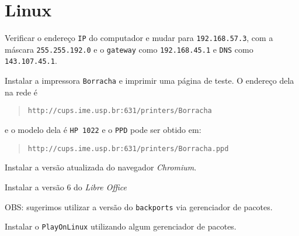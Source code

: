 \section*{Linux}
\begin{questions}

\question
Verificar o endereço \verb+IP+ do computador e mudar para \verb+192.168.57.3+,
com a máscara \verb+255.255.192.0+ e o \verb+gateway+ como \verb+192.168.45.1+
 e \verb+DNS+ como \verb+143.107.45.1+.

\question
Instalar a impressora \verb+Borracha+ e imprimir uma página de teste. O
endereço dela na rede é

\begin{quote}
\verb+http://cups.ime.usp.br:631/printers/Borracha+
\end{quote}

e o modelo dela é \verb+HP 1022+ e o \verb+PPD+ pode ser obtido em:
\begin{quote}
\verb+http://cups.ime.usp.br:631/printers/Borracha.ppd+
\end{quote}

\question
Instalar a versão atualizada do navegador \textit{Chromium}.

\question
Instalar a versão 6 do \textit{Libre Office}

OBS: sugerimos utilizar a versão do \verb+backports+ via gerenciador de pacotes.

\question
Instalar o \verb+PlayOnLinux+ utilizando algum gerenciador de pacotes.


\end{questions}
